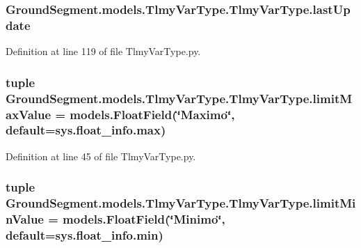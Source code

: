 \subsubsection[{last\+Update}]{\setlength{\rightskip}{0pt plus 5cm}Ground\+Segment.\+models.\+Tlmy\+Var\+Type.\+Tlmy\+Var\+Type.\+last\+Update}\label{class_ground_segment_1_1models_1_1_tlmy_var_type_1_1_tlmy_var_type_acd348562666a80fe077f5e1809bde3d5}


Definition at line 119 of file Tlmy\+Var\+Type.\+py.

\hypertarget{class_ground_segment_1_1models_1_1_tlmy_var_type_1_1_tlmy_var_type_ab42a42f83be3f8cd6ac9a539d8bf20d5}{}
\subsubsection[{limit\+Max\+Value}]{\setlength{\rightskip}{0pt plus 5cm}tuple Ground\+Segment.\+models.\+Tlmy\+Var\+Type.\+Tlmy\+Var\+Type.\+limit\+Max\+Value = models.\+Float\+Field(\char`\"{}Maximo\char`\"{}, default=sys.\+float\+\_\+info.\+max)\hspace{0.3cm}{\ttfamily [static]}}\label{class_ground_segment_1_1models_1_1_tlmy_var_type_1_1_tlmy_var_type_ab42a42f83be3f8cd6ac9a539d8bf20d5}


Definition at line 45 of file Tlmy\+Var\+Type.\+py.

\hypertarget{class_ground_segment_1_1models_1_1_tlmy_var_type_1_1_tlmy_var_type_a6a72ffd8c8ee632719af8e431e0c4cda}{}
\subsubsection[{limit\+Min\+Value}]{\setlength{\rightskip}{0pt plus 5cm}tuple Ground\+Segment.\+models.\+Tlmy\+Var\+Type.\+Tlmy\+Var\+Type.\+limit\+Min\+Value = models.\+Float\+Field(\char`\"{}Minimo\char`\"{}, default=sys.\+float\+\_\+info.\+min)\hspace{0.3cm}{\ttfamily [static]}}\label{class_ground_segment_1_1models_1_1_tlmy_var_type_1_1_tlmy_var_type_a6a72ffd8c8ee632719af8e431e0c4cda}


